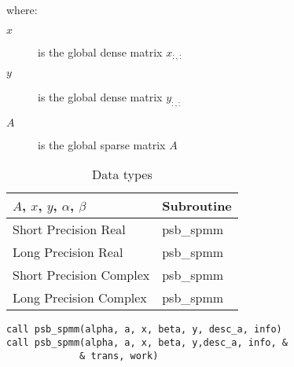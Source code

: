 where:
\begin{description}
\item[$x$] is the global dense matrix $x_{:, :}$
\item[$y$] is the global dense matrix $y_{:, :}$
\item[$A$] is the global sparse matrix $A$
\end{description}

\begin{table}[h]
\begin{center}
\begin{tabular}{ll}
\hline
$A$, $x$, $y$, $\alpha$, $\beta$ & {\bf Subroutine}\\
\hline
Short Precision Real & psb\_spmm \\
Long Precision Real & psb\_spmm \\
Short Precision Complex & psb\_spmm \\
Long Precision Complex & psb\_spmm \\
\hline
\end{tabular}
\end{center}
\caption{Data types\label{tab:f90spmm}}
\end{table}

\begin{verbatim}
call psb_spmm(alpha, a, x, beta, y, desc_a, info)
call psb_spmm(alpha, a, x, beta, y,desc_a, info, &
             & trans, work)
\end{verbatim} 

